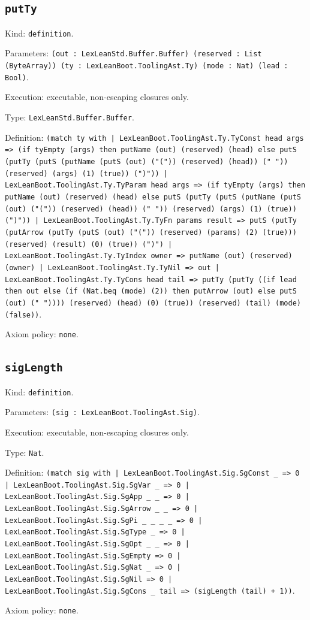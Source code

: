 \documentclass[11pt]{article}
\begin{document}
\subsection*{\texttt{putTy}}
\noindent Kind: \texttt{definition}.\par
\noindent Parameters: \texttt{(out : LexLeanStd.Buffer.Buffer) (reserved : List (ByteArray)) (ty : LexLeanBoot.ToolingAst.Ty) (mode : Nat) (lead : Bool)}.\par
\noindent Execution: executable, non-escaping closures only.\par
\noindent Type: \texttt{LexLeanStd.Buffer.Buffer}.\par
\noindent Definition: \texttt{(match ty with | LexLeanBoot.ToolingAst.Ty.TyConst head args => (if tyEmpty (args) then putName (out) (reserved) (head) else putS (putTy (putS (putName (putS (out) ("(")) (reserved) (head)) (" ")) (reserved) (args) (1) (true)) (")")) | LexLeanBoot.ToolingAst.Ty.TyParam head args => (if tyEmpty (args) then putName (out) (reserved) (head) else putS (putTy (putS (putName (putS (out) ("(")) (reserved) (head)) (" ")) (reserved) (args) (1) (true)) (")")) | LexLeanBoot.ToolingAst.Ty.TyFn params result => putS (putTy (putArrow (putTy (putS (out) ("(")) (reserved) (params) (2) (true))) (reserved) (result) (0) (true)) (")") | LexLeanBoot.ToolingAst.Ty.TyIndex owner => putName (out) (reserved) (owner) | LexLeanBoot.ToolingAst.Ty.TyNil => out | LexLeanBoot.ToolingAst.Ty.TyCons head tail => putTy (putTy ((if lead then out else (if (Nat.beq (mode) (2)) then putArrow (out) else putS (out) (" ")))) (reserved) (head) (0) (true)) (reserved) (tail) (mode) (false))}.\par
\noindent Axiom policy: \texttt{none}.\par
\subsection*{\texttt{sigLength}}
\noindent Kind: \texttt{definition}.\par
\noindent Parameters: \texttt{(sig : LexLeanBoot.ToolingAst.Sig)}.\par
\noindent Execution: executable, non-escaping closures only.\par
\noindent Type: \texttt{Nat}.\par
\noindent Definition: \texttt{(match sig with | LexLeanBoot.ToolingAst.Sig.SgConst \_ => 0 | LexLeanBoot.ToolingAst.Sig.SgVar \_ => 0 | LexLeanBoot.ToolingAst.Sig.SgApp \_ \_ => 0 | LexLeanBoot.ToolingAst.Sig.SgArrow \_ \_ => 0 | LexLeanBoot.ToolingAst.Sig.SgPi \_ \_ \_ \_ => 0 | LexLeanBoot.ToolingAst.Sig.SgType \_ => 0 | LexLeanBoot.ToolingAst.Sig.SgOpt \_ \_ => 0 | LexLeanBoot.ToolingAst.Sig.SgEmpty => 0 | LexLeanBoot.ToolingAst.Sig.SgNat \_ => 0 | LexLeanBoot.ToolingAst.Sig.SgNil => 0 | LexLeanBoot.ToolingAst.Sig.SgCons \_ tail => (sigLength (tail) + 1))}.\par
\noindent Axiom policy: \texttt{none}.\par
\end{document}
